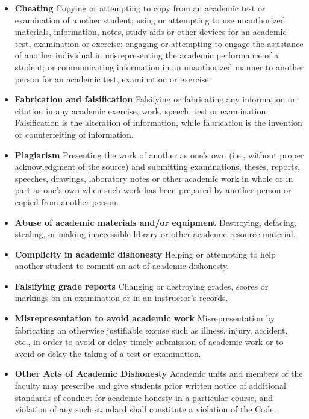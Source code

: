 \documentclass[12pt]{article}
\newcounter{ex}\setcounter{ex}{0}
\begin{document}
\begin{itemize}
    \item \textbf{Cheating} Copying or attempting to copy from an academic 
    test or examination of another student; using or attempting to 
    use unauthorized materials, information, notes, study aids or 
    other devices for an academic test, examination or exercise; 
    engaging or attempting to engage the assistance of another 
    individual in misrepresenting the academic performance of a 
    student; or communicating information in an unauthorized manner 
    to another person for an academic test, examination or exercise.
    
    \item \textbf{Fabrication and falsification} Falsifying or 
    fabricating any information or citation in any academic exercise, 
    work, speech, test or examination. Falsification is the 
    alteration of information, while fabrication is the invention 
    or counterfeiting of information.

    \item \textbf{Plagiarism}  Presenting the work of another as one's 
    own (i.e., without proper acknowledgment of the source) and 
    submitting examinations, theses, reports, speeches, drawings, 
    laboratory notes or other academic work in whole or in part as 
    one's own when such work has been prepared by another person or 
    copied from another person.

    \item \textbf{Abuse of academic materials and/or equipment} 
    Destroying, defacing, stealing, or making inaccessible library 
    or other academic resource material.

    \item \textbf{Complicity in academic dishonesty} Helping or 
    attempting to help another student to commit an act of academic 
    dishonesty.

    \item \textbf{Falsifying grade reports} Changing or destroying 
    grades, scores or markings on an examination or in an 
    instructor's records.

    \item \textbf{Misrepresentation to avoid academic work} 
    Misrepresentation by fabricating an otherwise justifiable 
    excuse such as illness, injury, accident, etc., in order 
    to avoid or delay timely submission of academic work or to 
    avoid or delay the taking of a test or examination.
    
    \item \textbf{Other Acts of Academic Dishonesty} Academic units 
    and members of the faculty may prescribe and give students prior 
    written notice of additional standards of conduct for academic 
    honesty in a particular course, and violation of any such 
    standard shall constitute a violation of the Code.

\end{itemize}
\end{document}
